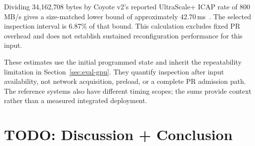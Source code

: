 \documentclass[acmsmall]{acmart}
\begin{document}
Dividing 34,162,708 bytes by Coyote v2's reported UltraScale+ ICAP rate of
800\,MB/s gives a size-matched lower bound of approximately
42.70\,ms~\cite[Section~5.3, Table~2]{ramhorst2025coyote}. The selected inspection
interval is 6.87\% of that bound. This calculation excludes fixed PR overhead
and does not establish sustained reconfiguration performance for this input.

These estimates use the initial programmed state and inherit the repeatability
limitation in Section~\ref{sec:eval-gpu}. They quantify inspection after input
availability, not network acquisition, preload, or a complete PR admission
path. The reference systems also have different timing scopes; the sums provide
context rather than a measured integrated deployment.

\section{TODO: Discussion + Conclusion}



\end{document}
